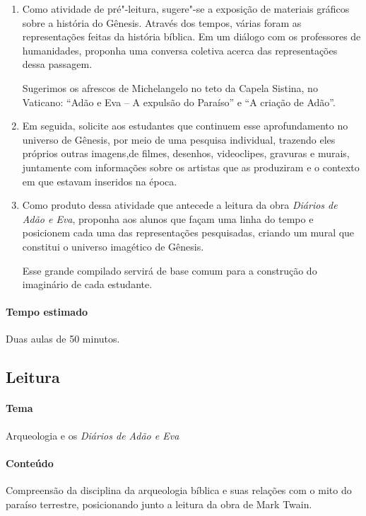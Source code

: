 \documentclass[12pt]{extarticle}
\begin{document}
\begin{enumerate}
\item
Como atividade de pré"-leitura, sugere"-se a exposição de materiais gráficos
sobre a história do Gênesis. Através dos tempos, várias foram as
representações feitas da história bíblica. Em um diálogo com os professores de humanidades, 
proponha uma conversa coletiva acerca das representações dessa passagem. 

Sugerimos os afrescos de Michelangelo no teto da 
Capela Sistina, no Vaticano: ``Adão e Eva -- A expulsão do Paraíso'' e ``A criação de Adão''. 

\item
Em seguida, solicite aos estudantes que continuem esse 
aprofundamento no universo de Gênesis, por 
meio de uma pesquisa individual, trazendo eles próprios 
outras imagens,de filmes, desenhos, videoclipes, 
gravuras e murais, juntamente com informações sobre os 
artistas que as produziram
e o contexto em que estavam inseridos na época.

\item
Como produto dessa atividade que antecede a leitura da obra 
\emph{Diários de Adão e Eva}, proponha aos alunos 
que façam uma linha do tempo e posicionem cada uma das 
representações pesquisadas, criando um  
mural que constitui o universo imagético de Gênesis. 

Esse grande compilado servirá de base comum para a construção do imaginário 
de cada estudante.
\end{enumerate}

\paragraph{Tempo estimado} Duas aulas de 50 minutos. 

\subsection{Leitura} 

\paragraph{Tema} Arqueologia e os \emph{Diários de Adão e Eva}

\paragraph{Conteúdo} Compreensão da disciplina da arqueologia bíblica e suas relações com o 
mito do paraíso terrestre, posicionando junto a leitura da obra de Mark Twain.
\end{document}
